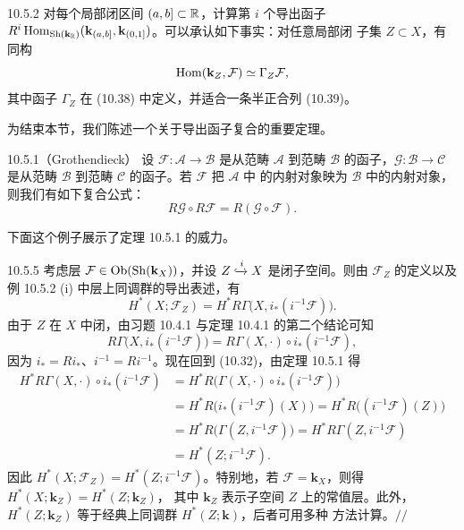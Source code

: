 \begin{wexer}{10.5.2}
对每个局部闭区间 $(a,b]\subset\mathbb{R}$，计算第 $i$ 个导出函子
$R^i\operatorname{Hom}_{\operatorname{Sh}(\mathbf{k}_{\mathbb{R}})}
(\mathbf{k}_{(a,b]},\mathbf{k}_{(0,1]})$。可以承认如下事实：对任意局部闭
子集 $Z\subset X$，有同构
\[
  \operatorname{Hom}(\mathbf{k}_Z,\mathcal F)\simeq\Gamma_Z\mathcal F,
\]
其中函子 $\Gamma_Z$ 在 (10.38) 中定义，并适合一条半正合列 (10.39)。
\end{wexer}

为结束本节，我们陈述一个关于导出函子复合的重要定理。

\begin{wthm}{10.5.1}（Grothendieck）
设 $\mathcal F:\mathcal A\to\mathcal B$ 是从范畴 $\mathcal A$ 到范畴
$\mathcal B$ 的函子，$\mathcal G:\mathcal B\to\mathcal C$ 是从范畴
$\mathcal B$ 到范畴 $\mathcal C$ 的函子。若 $\mathcal F$ 把 $\mathcal A$ 中
的内射对象映为 $\mathcal B$ 中的内射对象，则我们有如下复合公式：
\begin{equation}\tag{10.31}
  R\mathcal G\circ R\mathcal F=R(\mathcal G\circ\mathcal F).
\end{equation}
\end{wthm}


下面这个例子展示了定理 10.5.1 的威力。

\begin{wexam}{10.5.5}
考虑层 $\mathcal F\in\operatorname{Ob}(\operatorname{Sh}(\mathbf{k}_X))$，并设
$Z\xhookrightarrow{i}X$ 是闭子空间。则由 $\mathcal F_Z$ 的定义以及例
10.5.2 (i) 中层上同调群的导出表述，有
\begin{equation}\tag{10.32}
  H^*(X;\mathcal F_Z)
  =H^*R\Gamma\bigl(X,i_*(i^{-1}\mathcal F)\bigr).
\end{equation}
由于 $Z$ 在 $X$ 中闭，由习题 10.4.1 与定理 10.4.1 的第二个结论可知
\[
  R\Gamma\bigl(X,i_*(i^{-1}\mathcal F)\bigr)
  =R\Gamma(X,\cdot)\circ i_*(i^{-1}\mathcal F),
\]
因为 $i_*=Ri_*$、$i^{-1}=Ri^{-1}$。现在回到 (10.32)，由定理 10.5.1 得
\begin{align*}
  H^*R\Gamma(X,\cdot)\circ i_*(i^{-1}\mathcal F)
  &=H^*R\bigl(\Gamma(X,\cdot)\circ i_*(i^{-1}\mathcal F)\bigr)\\
  &=H^*R\bigl(i_*(i^{-1}\mathcal F)(X)\bigr)
   =H^*R\bigl((i^{-1}\mathcal F)(Z)\bigr)\\
  &=H^*R\bigl(\Gamma(Z,i^{-1}\mathcal F)\bigr)
   =H^*R\Gamma(Z,i^{-1}\mathcal F)\\
  &=H^*(Z;i^{-1}\mathcal F).
\end{align*}
因此 $H^*(X;\mathcal F_Z)=H^*(Z;i^{-1}\mathcal F)$。特别地，若
$\mathcal F=\mathbf{k}_X$，则得 $H^*(X;\mathbf{k}_Z)=H^*(Z;\mathbf{k}_Z)$，
其中 $\mathbf{k}_Z$ 表示子空间 $Z$ 上的常值层。此外，
$H^*(Z;\mathbf{k}_Z)$ 等于经典上同调群 $H^*(Z;\mathbf{k})$，后者可用多种
方法计算。\hfill$//$
\end{wexam}
